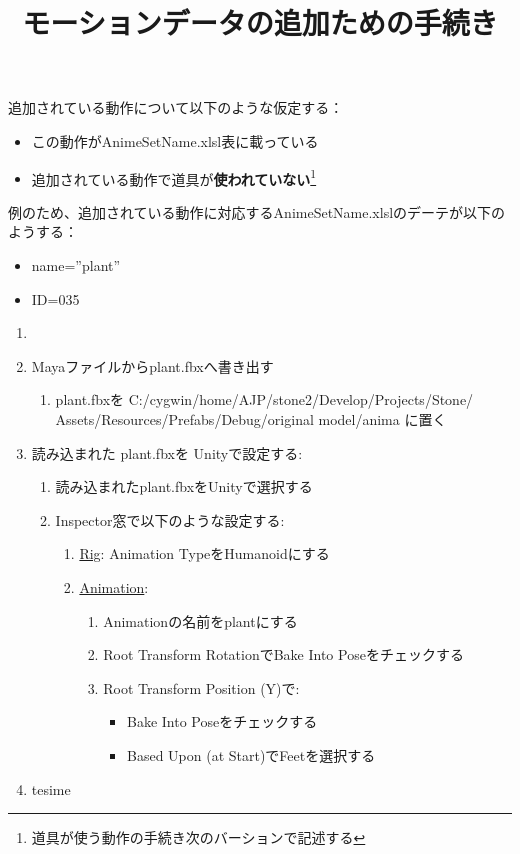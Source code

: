 \documentclass[a4paper]{report}
\title{モーションデータの追加ための手続き}
\newcommand{\tname}{{\ttfamily AnimeSetName.xlsl}}
\newcommand{\fbxname}{\ttfamily plant.fbx}
\begin{document}
\maketitle
追加されている動作について以下のような仮定する：
\begin{itemize}
	\item この動作が{\ttfamily AnimeSetName.xlsl}表に載っている
	\item 追加されている動作で道具が\textbf{使われていない}\footnote{道具が使う動作の手続き次のバーションで記述する}
\end{itemize}
例のため、追加されている動作に対応する\tname のデーテが以下のようする：
\begin{itemize}
	\item {\ttfamily name=''plant''}
	\item {\ttfamily ID=035}
\end{itemize}
\begin{enumerate}
	\item 
	\item Mayaファイルから{\ttfamily plant.fbx}へ書き出す\begin{enumerate}
			\item \fbxname を {\ttfamily 
				C:/cygwin/home/AJP/stone2/Develop/Projects/Stone/}\\{\ttfamily Assets/Resources/Prefabs/Debug/original model/anima
				}に置く
		\end{enumerate}
	\item 読み込まれた \fbxname を Unityで設定する:
	\begin{enumerate}
		\item 読み込まれた\fbxname をUnityで選択する
		\item Inspector窓で以下のような設定する:
			\begin{enumerate}
				\item \underline{Rig}: Animation TypeをHumanoidにする
				\item \underline{Animation}:
					\begin{enumerate}
						\item Animationの名前をplantにする
						\item Root Transform RotationでBake Into Poseをチェックする
						\item Root Transform Position (Y)で:\begin{itemize}
								\item Bake Into Poseをチェックする
								\item Based Upon (at Start)でFeetを選択する
							\end{itemize}
					\end{enumerate}
			\end{enumerate}
	\end{enumerate}
	\item tesime
\end{enumerate}
\end{document}
